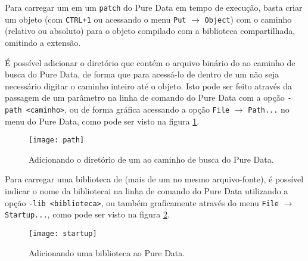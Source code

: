 Para carregar um \external em um \texttt{patch} do Pure Data em tempo de
execução, basta criar um objeto (com \texttt{CTRL+1} ou acessando o menu
\texttt{Put} $\rightarrow$ \texttt{Object}) com o caminho (relativo ou
absoluto) para o objeto compilado com a biblioteca compartilhada, omitindo a
extensão.

É possível adicionar o diretório que contém o arquivo binário do \external ao
caminho de busca do Pure Data, de forma que para acessá-lo de dentro de um
\patch não seja necessário digitar o caminho inteiro até o objeto. Isto pode
ser feito através da passagem de um parâmetro na linha de comando do Pure Data
com a opção \texttt{-path <caminho>}, ou de forma gráfica acessando a opção
\texttt{File} $\rightarrow$ \texttt{Path...} no menu do Pure Data,
como pode ser visto na figura \ref{fig:search-path}.

\begin{figure}[h!]
  \centering
  \texttt{[image: path]}
  \caption{Adicionando o diretório de um \external ao caminho de busca do Pure Data.}
  \label{fig:search-path}
\end{figure}

Para carregar uma biblioteca de \externals (mais de um \external no mesmo
arquivo-fonte), é possível indicar o nome da bibliotecai na linha
de comando do Pure Data utilizando a opção \texttt{-lib <biblioteca>}, ou
também graficamente através do menu \texttt{File} $\rightarrow$
\texttt{Startup...}, como pode ser visto na figura \ref{fig:lib}.

\begin{figure}[h!]
  \centering
  \texttt{[image: startup]}
  \caption{Adicionando uma biblioteca ao Pure Data.}
  \label{fig:lib}
\end{figure}

